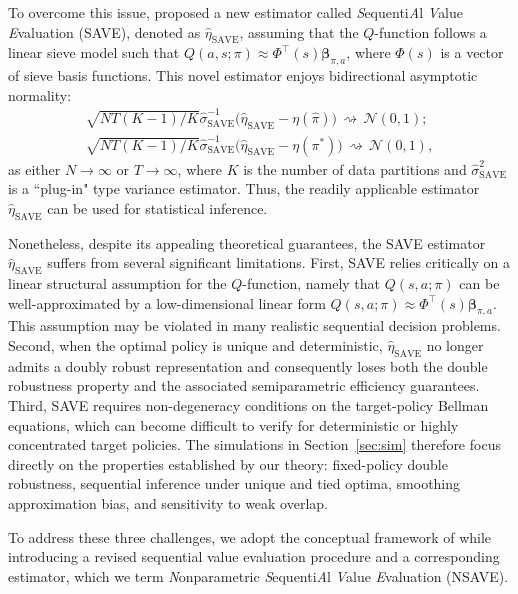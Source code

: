 \documentclass[12pt]{article}
\theoremstyle{remark}\newtheorem{remark}[theorem]{Remark}\theoremstyle{plain}
\newcommand{\bs}{\boldsymbol}
\begin{document}
To overcome this issue, \cite{shi2022statistical} proposed a new estimator called \textit{S}equenti\textit{A}l \textit{V}alue \textit{E}valuation (SAVE), denoted as $\widehat{\eta}_{\text{SAVE}}$, assuming that the $Q$-function follows a linear sieve model such that $Q (a, s; \pi) \approx \Phi^{\top}(s) \bm{\beta}_{\pi, a}$, where $\Phi(s)$ is a vector of sieve basis functions. This novel estimator enjoys bidirectional asymptotic normality:
\[
    \begin{aligned}
        \sqrt{NT (K - 1) / K}  \widehat{\sigma}_{\text{SAVE}}^{-1}\big( \widehat{\eta}_{\text{SAVE}} - \eta (\widehat{\pi})\big) \, \rightsquigarrow \, \mathcal{N}(0, 1); \\
        \sqrt{NT (K - 1) / K} \widehat{\sigma}_{\text{SAVE}}^{-1}\big( \widehat{\eta}_{\text{SAVE}} - \eta ({\pi}^*)\big) \, \rightsquigarrow \, \mathcal{N}(0, 1),
    \end{aligned}
\]
as either $N \rightarrow \infty$ or $T \rightarrow \infty$, where $K$ is the number of data partitions and $\widehat{\sigma}_{\text{SAVE}}^2$ is a ``plug-in" type variance estimator. Thus, the readily applicable estimator $\widehat{\eta}_{\text{SAVE}}$ can be used for statistical inference. 


Nonetheless, despite its appealing theoretical guarantees, the SAVE estimator $\widehat{\eta}_{\text{SAVE}}$ suffers from several significant limitations. First, SAVE relies critically on a linear structural assumption for the $Q$-function, namely that $Q(s,a;\pi)$ can be well-approximated by a low-dimensional linear form $Q(s,a;\pi)\approx \Phi^\top(s)\bs{\beta}_{\pi,a}$. This assumption may be violated in many realistic sequential decision problems. Second, when the optimal policy is unique and deterministic, $\widehat{\eta}_{\text{SAVE}}$ no longer admits a doubly robust representation and consequently loses both the double robustness property and the associated semiparametric efficiency guarantees. Third, SAVE requires non-degeneracy conditions on the target-policy Bellman equations, which can become difficult to verify for deterministic or highly concentrated target policies. The simulations in Section~\ref{sec:sim} therefore focus directly on the properties established by our theory: fixed-policy double robustness, sequential inference under unique and tied optima, smoothing approximation bias, and sensitivity to weak overlap.

To address these three challenges, we adopt the conceptual framework of \cite{shi2022statistical} while introducing a revised sequential value evaluation procedure and a corresponding estimator, which we term \textit{N}onparametric \textit{S}equenti\textit{A}l \textit{V}alue \textit{E}valuation (NSAVE).
\end{document}
